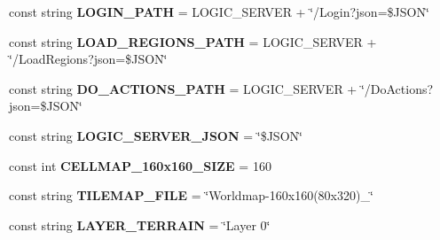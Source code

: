 \begin{DoxyCompactItemize}
\item 
\hypertarget{classClient_1_1Common_1_1Helper_1_1ClientConstants_a54709bc353b9c204d6c9649ff76de5cb}{const string {\bfseries L\-O\-G\-I\-N\-\_\-\-P\-A\-T\-H} = L\-O\-G\-I\-C\-\_\-\-S\-E\-R\-V\-E\-R + \char`\"{}/Login?json=\$J\-S\-O\-N\char`\"{}}\label{classClient_1_1Common_1_1Helper_1_1ClientConstants_a54709bc353b9c204d6c9649ff76de5cb}

\item 
\hypertarget{classClient_1_1Common_1_1Helper_1_1ClientConstants_adb27b1857784ed0d60bde8d7be06fce2}{const string {\bfseries L\-O\-A\-D\-\_\-\-R\-E\-G\-I\-O\-N\-S\-\_\-\-P\-A\-T\-H} = L\-O\-G\-I\-C\-\_\-\-S\-E\-R\-V\-E\-R + \char`\"{}/Load\-Regions?json=\$J\-S\-O\-N\char`\"{}}\label{classClient_1_1Common_1_1Helper_1_1ClientConstants_adb27b1857784ed0d60bde8d7be06fce2}

\item 
\hypertarget{classClient_1_1Common_1_1Helper_1_1ClientConstants_a288cdae05f5b0efa041eb10ed5d5b693}{const string {\bfseries D\-O\-\_\-\-A\-C\-T\-I\-O\-N\-S\-\_\-\-P\-A\-T\-H} = L\-O\-G\-I\-C\-\_\-\-S\-E\-R\-V\-E\-R + \char`\"{}/Do\-Actions?json=\$J\-S\-O\-N\char`\"{}}\label{classClient_1_1Common_1_1Helper_1_1ClientConstants_a288cdae05f5b0efa041eb10ed5d5b693}

\item 
\hypertarget{classClient_1_1Common_1_1Helper_1_1ClientConstants_ae0f3b5d21066fa553b3173acba49a0d9}{const string {\bfseries L\-O\-G\-I\-C\-\_\-\-S\-E\-R\-V\-E\-R\-\_\-\-J\-S\-O\-N} = \char`\"{}\$J\-S\-O\-N\char`\"{}}\label{classClient_1_1Common_1_1Helper_1_1ClientConstants_ae0f3b5d21066fa553b3173acba49a0d9}

\item 
\hypertarget{classClient_1_1Common_1_1Helper_1_1ClientConstants_a5d50b38f09c095e2634a22d1104126b1}{const int {\bfseries C\-E\-L\-L\-M\-A\-P\-\_\-160x160\-\_\-\-S\-I\-Z\-E} = 160}\label{classClient_1_1Common_1_1Helper_1_1ClientConstants_a5d50b38f09c095e2634a22d1104126b1}

\item 
\hypertarget{classClient_1_1Common_1_1Helper_1_1ClientConstants_a7fd36de3c05426f7a5ec6abda4467ffd}{const string {\bfseries T\-I\-L\-E\-M\-A\-P\-\_\-\-F\-I\-L\-E} = \char`\"{}Worldmap-\/160x160(80x320)\-\_\char`\"{}}\label{classClient_1_1Common_1_1Helper_1_1ClientConstants_a7fd36de3c05426f7a5ec6abda4467ffd}

\item 
\hypertarget{classClient_1_1Common_1_1Helper_1_1ClientConstants_ad5629033db14bd9fe132847af3daed00}{const string {\bfseries L\-A\-Y\-E\-R\-\_\-\-T\-E\-R\-R\-A\-I\-N} = \char`\"{}Layer 0\char`\"{}}\label{classClient_1_1Common_1_1Helper_1_1ClientConstants_ad5629033db14bd9fe132847af3daed00}


\end{DoxyCompactItemize}
